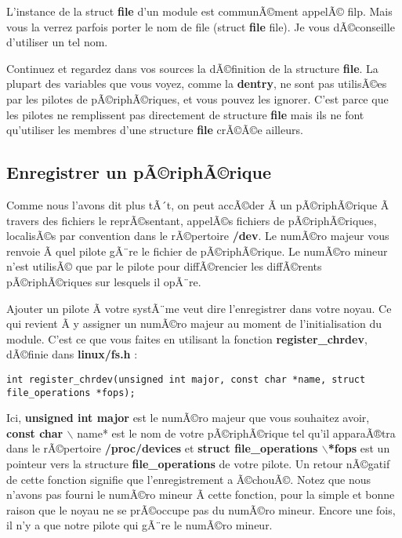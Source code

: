 \documentclass[11pt]{article}
\begin{document}
L'instance de la struct \textbf{file} d'un module est communÃ©ment appelÃ© filp. Mais vous la verrez parfois porter le nom de file (struct \textbf{file} file). Je vous dÃ©conseille d'utiliser un tel nom.

Continuez et regardez dans vos sources la dÃ©finition de la structure \textbf{file}. La plupart des variables que vous voyez, comme la \textbf{dentry}, ne sont pas utilisÃ©es par les pilotes de pÃ©riphÃ©riques, et vous pouvez les ignorer. C'est parce que les pilotes ne remplissent pas directement de structure \textbf{file} mais ils ne font qu'utiliser les membres d'une structure \textbf{file} crÃ©Ã©e ailleurs.

\subsection*{Enregistrer un pÃ©riphÃ©rique}
\label{sec-6-3}

Comme nous l'avons dit plus tÃ´t, on peut accÃ©der Ã  un pÃ©riphÃ©rique Ã  travers des fichiers le reprÃ©sentant, appelÃ©s fichiers de pÃ©riphÃ©riques, localisÃ©s par convention dans le rÃ©pertoire \textbf{/dev}. Le numÃ©ro majeur vous renvoie Ã  quel pilote gÃ¨re le fichier de pÃ©riphÃ©rique. Le numÃ©ro mineur n'est utilisÃ© que par le pilote pour diffÃ©rencier les diffÃ©rents pÃ©riphÃ©riques sur lesquels il opÃ¨re.

Ajouter un pilote Ã  votre systÃ¨me veut dire l'enregistrer dans votre noyau. Ce qui revient Ã  y assigner un numÃ©ro majeur au moment de l'initialisation du module. C'est ce que vous faites en utilisant la fonction \textbf{register\_chrdev}, dÃ©finie dans \textbf{linux/fs.h} :

\begin{verbatim}
int register_chrdev(unsigned int major, const char *name, struct file_operations *fops);
\end{verbatim}

Ici, \textbf{unsigned int major} est le numÃ©ro majeur que vous souhaitez avoir, \textbf{const char $\backslash$} name* est le nom de votre pÃ©riphÃ©rique tel qu'il apparaÃ®tra dans le rÃ©pertoire \textbf{/proc/devices} et \textbf{struct file\_operations $\backslash$*fops} est un pointeur vers la structure \textbf{file\_operations} de votre pilote. Un retour nÃ©gatif de cette fonction signifie que l'enregistrement a Ã©chouÃ©. Notez que nous n'avons pas fourni le numÃ©ro mineur Ã  cette fonction, pour la simple et bonne raison que le noyau ne se prÃ©occupe pas du numÃ©ro mineur. Encore une fois, il n'y a que notre pilote qui gÃ¨re le numÃ©ro mineur.
\end{document}

